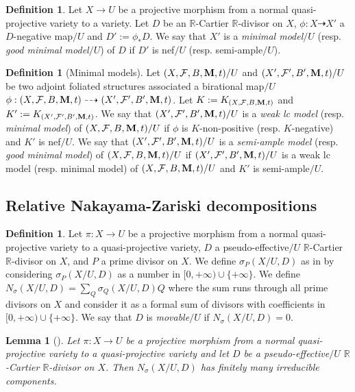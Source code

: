 \documentclass[12pt]{amsart}
\numberwithin{equation}{section}
\newcommand{\Mm}{{\bf{M}}}
\newcommand{\Rr}{\mathbb{R}}
\newcommand{\Ff}{\mathcal{F}}
\newtheorem{lem}[thm]{Lemma}
\theoremstyle{definition}
\newtheorem{defn}[thm]{Definition}
\theoremstyle{definition}
\theoremstyle{definition}
\begin{document}
\begin{defn} Let $X\rightarrow U$ be a projective morphism from a normal quasi-projective variety to a variety. Let $D$ be an $\Rr$-Cartier $\Rr$-divisor on $X$, $\phi: X\dashrightarrow X'$ a $D$-negative map$/U$ and $D':=\phi_\ast D$. We say that $X'$ is a \emph{minimal model}$/U$ (resp. \emph{good minimal model}$/U$) of $D$ if $D'$ is nef$/U$ (resp. semi-ample$/U$).
\end{defn}

\begin{defn}[Minimal models]\label{defn: minimal model}
    Let $(X,\Ff,B,\Mm,t)/U$ and $(X',\Ff',B',\Mm,t)/U$  be two adjoint foliated structures associated a birational map$/U$ $\phi: (X,\Ff,B,\Mm,t)\dashrightarrow (X',\Ff',B',\Mm,t)$. Let $K:=K_{(X,\Ff,B,\Mm,t)}$ and $K':=K_{(X',\Ff',B',\Mm,t)}$. We say that $(X',\Ff',B',\Mm,t)/U$ is a \emph{weak lc model} (resp. \emph{minimal model}) of $(X,\Ff,B,\Mm,t)/U$ if $\phi$ is $K$-non-positive (resp. $K$-negative) and $K'$ is nef$/U$. We say that  $(X',\Ff',B',\Mm,t)/U$ is a \emph{semi-ample model} (resp. \emph{good minimal model}) of $(X,\Ff,B,\Mm,t)/U$ if $(X',\Ff',B',\Mm,t)/U$ is a weak lc model (resp. minimal model) of $(X,\Ff,B,\Mm,t)/U$ and $K'$ is semi-ample$/U$.
\end{defn}



\subsection{Relative Nakayama-Zariski decompositions}

\begin{defn}
    Let $\pi: X\rightarrow U$ be a projective morphism from a normal quasi-projective variety to a quasi-projective variety, $D$ a pseudo-effective$/U$ $\Rr$-Cartier $\Rr$-divisor on $X$, and $P$ a prime divisor on $X$. We define $\sigma_{P}(X/U,D)$ as in \cite[Definition 3.1]{LX23} by considering $\sigma_{P}(X/U,D)$ as a number in  $[0,+\infty)\cup\{+\infty\}$. We define $N_{\sigma}(X/U,D)=\sum_Q\sigma_Q(X/U,D)Q$
    where the sum runs through all prime divisors on $X$ and consider it as a formal sum of divisors with coefficients in $[0,+\infty)\cup\{+\infty\}$. We say that $D$ is \emph{movable$/U$} if $N_{\sigma}(X/U,D)=0$.
\end{defn}

\begin{lem}[{\cite[Lemma 3.5]{LX23}}]\label{lem: finiteness of sigmap}
Let $\pi: X\rightarrow U$ be a projective morphism from a normal quasi-projective variety to a quasi-projective variety and let $D$ be a pseudo-effective$/U$ $\Rr$-Cartier $\Rr$-divisor on $X$. Then $N_{\sigma}(X/U,D)$ has finitely many irreducible components. 
\end{lem}
\end{document}
